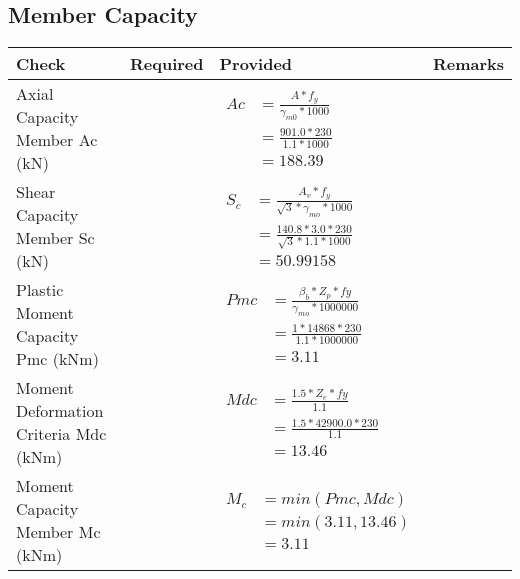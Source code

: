 \documentclass{article}%
\begin{document}
\subsection{Member Capacity}%
\label{subsec:MemberCapacity}%
\renewcommand{\arraystretch}{1.2}%
\begin{longtable}{|p{4cm}|p{5cm}|p{5.5cm}|p{1.5cm}|}%
\hline%
\rowcolor{OsdagGreen}%
Check&Required&Provided&Remarks\\%
\hline%
\endhead%
\hline%
Axial Capacity Member Ac (kN)&&$\begin{aligned} Ac &=\frac{A*f_y}{\gamma_{m0} *1000}\\ &=\frac{901.0*230}{1.1* 1000}\\ &=188.39\end{aligned}$&\\%
\hline%
Shear Capacity Member Sc (kN)&&$\begin{aligned} S_c &= \frac{A_v*f_y}{\sqrt{3}*\gamma_{mo} *1000}\\ &=\frac{140.8*3.0*230}{\sqrt{3}*1.1 *1000}\\ &=50.99158\end{aligned}$&\\%
\hline%
Plastic Moment Capacity Pmc (kNm)&&$\begin{aligned} Pmc &= \frac{\beta_b * Z_p *fy}{\gamma_{mo} * 1000000}\\ &=\frac{1*14868*230}{1.1 * 1000000}\\ &=3.11\end{aligned}$&\\%
\hline%
Moment Deformation Criteria Mdc (kNm)&&$\begin{aligned} Mdc &= \frac{1.5 *Z_e *fy}{1.1}\\ &= \frac{1.5 *42900.0*230}{1.1}\\ &= 13.46\end{aligned}$&\\%
\hline%
Moment Capacity Member Mc (kNm)&&$\begin{aligned} M_c &= min(Pmc,Mdc)\\ &=min(3.11,13.46)\\ &=3.11\end{aligned}$&\\%
\hline%
\end{longtable}

%
\end{document}

